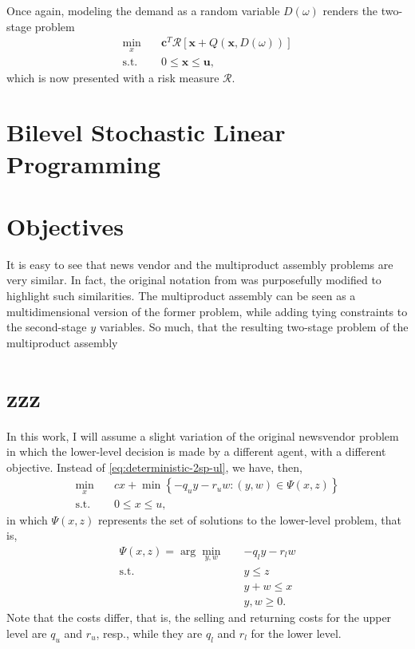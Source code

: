 \documentclass[twoside,11pt]{article}
\begin{document}
Once again, modeling the demand as a random variable $D(\omega)$ renders the two-stage problem
\begin{align*}
    \min_{x} \quad & \bm{c}^{T} \mathcal{R}\left[  \bm{x} + Q(\bm{x},D(\omega)) \right]  \\
    \textrm{s.t.} \quad & 0\le \bm{x} \le \bm{u}
,\end{align*}
which is now presented with a risk measure $\mathcal{R}$.


\section*{Bilevel Stochastic Linear Programming}



\section*{Objectives}


It is easy to see that news vendor and the multiproduct assembly problems are very similar.
In fact, the original notation from \citet{shapiroLecturesStochasticProgramming2009} was purposefully modified to highlight such similarities.
The multiproduct assembly can be seen as a multidimensional version of the former problem, while adding tying constraints to the second-stage $y$ variables.
So much, that the resulting two-stage problem of the multiproduct assembly 








\section*{zzz}



In this work, I will assume a slight variation of the original newsvendor problem in which the lower-level decision is made by a different agent, with a different objective.
Instead of \eqref{eq:deterministic-2sp-ul}, we have, then,
\begin{equation}\label{eq:deterministic-bilevel-ul}
\begin{split}
    \min_{x} \quad & cx + \min\left\{ -q_u y -r_u w : (y,w)\in \Psi(x,z) \right\}  \\
    \textrm{s.t.} \quad & 0\le x\le u
,\end{split}
\end{equation}
in which $\Psi(x,z)$ represents the set of solutions to the lower-level problem, that is,
\begin{equation}\label{eq:deterministic-bilevel-ll}
\begin{split}
    \Psi(x,z) = \arg\min_{y,w} \quad & -q_l y - r_l w \\
    \textrm{s.t.} \quad & y\le z \\
      & y+w \le x \\
      & y,w \ge 0
.\end{split}
\end{equation}
Note that the costs differ, that is, the selling and returning costs for the upper level are $q_u$ and $r_u$, resp., while they are $q_l$ and $r_l$ for the lower level.



% 
\printbibliography
    
\end{document}
